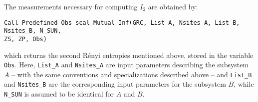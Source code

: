 The measurements necessary for computing $I_2$ are obtained by:
\begin{lstlisting}[style=fortran,breaklines=true]
Call Predefined_Obs_scal_Mutual_Inf(GRC, List_A, Nsites_A, List_B, Nsites_B, N_SUN, 
ZS, ZP, Obs)
\end{lstlisting}
which returns the second R\'enyi entropies mentioned above, stored in the variable \texttt{Obs}. Here, \texttt{List\_A} and \texttt{Nsites\_A} are input parameters describing the subsystem $A$ -- with the same conventions and specializations described above -- and
\texttt{List\_B} and \texttt{Nsites\_B} are the corresponding input parameters for the subsystem $B$, while \texttt{N\_SUN} is assumed to be identical for $A$ and $B$.


